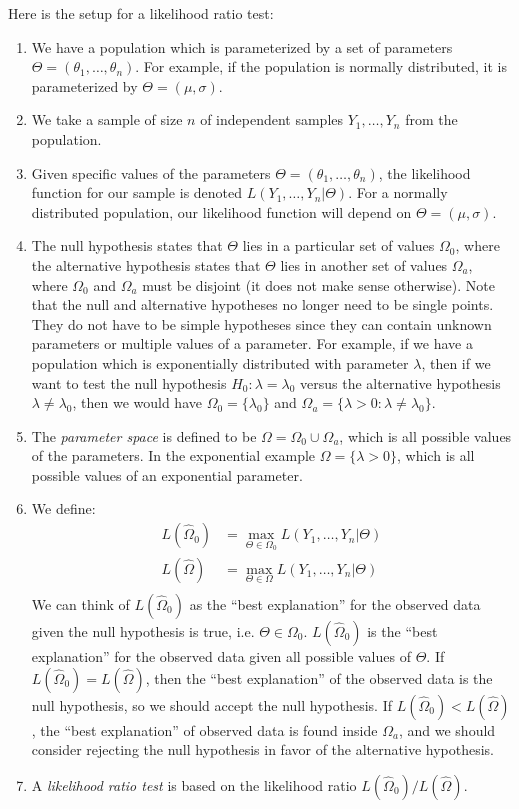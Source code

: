 \documentclass[notes.tex]{subfiles}
\begin{document}
Here is the setup for a likelihood ratio test:
\begin{enumerate}
\item We have a population which is parameterized by a set of parameters $\Theta = (\theta_1, \dots, \theta_n)$. For example, if the population is normally distributed, it is parameterized by $\Theta = (\mu, \sigma)$.
\item We take a sample of size $n$ of independent samples $Y_1, \dots, Y_n$ from the population.
\item Given specific values of the parameters $\Theta = (\theta_1, \dots, \theta_n)$, the likelihood function for our sample is denoted $L(Y_1, \dots, Y_n|\Theta)$. For a normally distributed population, our likelihood function will depend on $\Theta = (\mu, \sigma)$.
\item The null hypothesis states that $\Theta$ lies in a particular set of values $\Omega_0$, where the alternative hypothesis states that $\Theta$ lies in another set of values $\Omega_a$, where $\Omega_0$ and $\Omega_a$ must be disjoint (it does not make sense otherwise). Note that the null and alternative hypotheses no longer need to be single points. They do not have to be simple hypotheses since they can contain unknown parameters or multiple values of a parameter. For example, if we have a population which is exponentially distributed with parameter $\lambda$, then if we want to test the null hypothesis $H_0: \lambda = \lambda_0$ versus the alternative hypothesis $\lambda \neq \lambda_0$, then we would have $\Omega_0 = \{ \lambda_0 \}$ and $\Omega_a = \{ \lambda > 0 : \lambda \neq \lambda_0 \}$.
\item The \emph{parameter space} is defined to be $\Omega = \Omega_0 \cup \Omega_a$, which is all possible values of the parameters. In the exponential example $\Omega = \{ \lambda > 0 \}$, which is all possible values of an exponential parameter.
\item We define:
\begin{align*}
L(\hat{\Omega}_0) &= \max_{\Theta \in \Omega_0} L(Y_1, \dots, Y_n|\Theta) \\
L(\hat{\Omega}) &= \max_{\Theta \in \Omega} L(Y_1, \dots, Y_n|\Theta) \\
\end{align*}
We can think of $L(\hat{\Omega}_0)$ as the ``best explanation'' for the observed data given the null hypothesis is true, i.e. $\Theta \in \Omega_0$. $L(\hat{\Omega}_0)$ is the ``best explanation'' for the observed data given all possible values of $\Theta$. If $L(\hat{\Omega}_0) = L(\hat{\Omega})$, then the ``best explanation'' of the observed data is the null hypothesis, so we should accept the null hypothesis. If $L(\hat{\Omega}_0) < L(\hat{\Omega})$, the ``best explanation'' of observed data is found inside $\Omega_a$, and we should consider rejecting the null hypothesis in favor of the alternative hypothesis.
\item A \emph{likelihood ratio test} is based on the likelihood ratio $L(\hat{\Omega}_0)/L(\hat{\Omega})$.
\end{enumerate}
\end{document}
